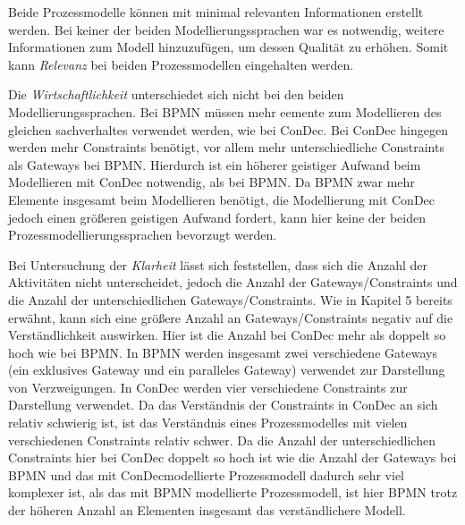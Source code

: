 Beide Prozessmodelle können mit minimal relevanten Informationen erstellt werden. Bei keiner der beiden Modellierungssprachen war es notwendig, weitere Informationen zum Modell hinzuzufügen, um dessen Qualität zu erhöhen. Somit kann \textit{Relevanz} bei beiden Prozessmodellen eingehalten werden.\newline


Die \textit{Wirtschaftlichkeit} unterschiedet sich nicht bei den beiden Modellierungssprachen. Bei BPMN müssen mehr eemente zum Modellieren des gleichen sachverhaltes verwendet werden, wie bei ConDec. Bei ConDec hingegen werden mehr Constraints benötigt, vor allem mehr unterschiedliche Constraints als Gateways bei BPMN. Hierdurch ist ein höherer geistiger Aufwand beim Modellieren mit ConDec notwendig, als bei BPMN.\newline
Da BPMN zwar mehr Elemente insgesamt beim Modellieren benötigt, die Modellierung mit ConDec jedoch einen größeren geistigen Aufwand fordert, kann hier keine der beiden Prozessmodellierungssprachen bevorzugt werden.\newline

Bei Untersuchung der \textit{Klarheit} lässt sich feststellen, dass sich die Anzahl der Aktivitäten nicht unterscheidet, jedoch die Anzahl der Gateways/Constraints und die Anzahl der unterschiedlichen Gateways/Constraints. Wie in Kapitel 5 bereits erwähnt, kann sich eine größere Anzahl an Gateways/Constraints negativ auf die Verständlichkeit auswirken. Hier ist die Anzahl bei ConDec mehr als doppelt so hoch wie bei BPMN. In BPMN werden insgesamt zwei verschiedene Gateways (ein exklusives Gateway und ein paralleles Gateway) verwendet zur Darstellung von Verzweigungen. In ConDec werden vier verschiedene Constraints zur Darstellung verwendet. Da das Verständnis der Constraints in ConDec an sich relativ schwierig ist, ist das Verständnis eines Prozessmodelles mit vielen verschiedenen Constraints relativ schwer. Da die Anzahl der unterschiedlichen Constraints hier bei ConDec doppelt so hoch ist wie die Anzahl der Gateways bei BPMN und das mit ConDecmodellierte Prozessmodell dadurch sehr viel komplexer ist, als das mit BPMN modellierte Prozessmodell, ist hier BPMN trotz der höheren Anzahl an Elementen insgesamt das verständlichere Modell.
\newline

